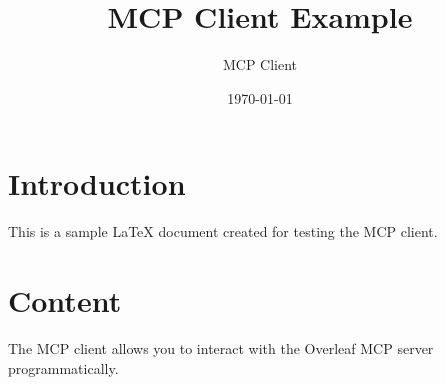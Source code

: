 \documentclass{article}
\title{MCP Client Example}
\author{MCP Client}
\date{\today}
\begin{document}
\maketitle

\section{Introduction}
This is a sample LaTeX document created for testing the MCP client.

\section{Content}
The MCP client allows you to interact with the Overleaf MCP server programmatically.
\end{document}
